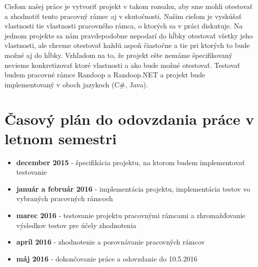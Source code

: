 \documentclass[11pt,twoside,slovak,a4paper]{article}
\begin{document}
	Cieľom našej práce je vytvoriť projekt v takom rozsahu, aby sme mohli otestovať a zhodnotiť tento pracovný rámec aj v skutočnosti. Našim cieľom je vyskúšať vlastnosti tie vlastnosti pracovného rámca, o ktorých sa v práci diskutuje. Na jednom projekte sa nám pravdepodobne nepodarí do hĺbky otestovať všetky jeho vlastnosti, ale chceme otestovať každú aspoň čiastočne a tie pri ktorých to bude možné aj do hĺbky. Vzhľadom na to, že projekt ešte nemáme špecifikovaný nevieme konkretizovať ktoré vlastnosti a ako bude možné otestovať. Testovať budem pracovné rámce Randoop a Randoop.NET a projekt bude implementovaný v oboch jazykoch (C\#, Java).
	
	\newpage
	\section{Časový plán do odovzdania práce v letnom semestri}
	\begin{itemize}
		\item \textbf{december 2015} - špecifikácia projektu, na ktorom budem implementovať testovanie
		\item \textbf{január a február 2016} - implementácia projektu, implementácia testov vo vybraných pracovných rámcoch
		\item \textbf{marec 2016} - testovanie projektu pracovnými rámcami a zhromažďovanie výsledkov testov pre účely zhodnotenia
		\item \textbf{apríl 2016} - zhodnotenie a porovnávanie pracovných rámcov
		\item \textbf{máj 2016} - dokončovanie práce a odovzdanie do 10.5.2016
	\end{itemize}
 	
 	\begin{titlepage}
 		
 		
 	\end{titlepage}
	
\end{document}
